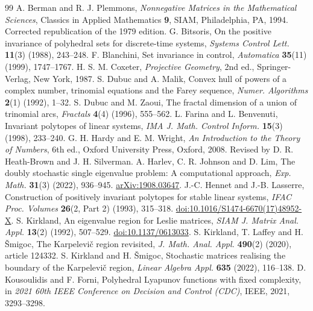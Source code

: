 \documentclass[11pt,a4paper]{article}
\theoremstyle{definition}
\theoremstyle{remark}
\numberwithin{equation}{section}
\begin{document}
\begin{thebibliography}{99}
 A. Berman and R. J. Plemmons,
\emph{Nonnegative Matrices in the Mathematical Sciences},
Classics in Applied Mathematics \textbf{9}, SIAM, Philadelphia, PA, 1994.
Corrected republication of the 1979 edition.
 G. Bitsoris,
On the positive invariance of polyhedral sets for discrete-time systems,
\emph{Systems Control Lett.} \textbf{11}(3) (1988), 243--248.
 F. Blanchini,
Set invariance in control,
\emph{Automatica} \textbf{35}(11) (1999), 1747--1767.
 H. S. M. Coxeter,
\emph{Projective Geometry}, 2nd ed., Springer-Verlag, New York, 1987.
 S. Dubuc and A. Malik,
Convex hull of powers of a complex number, trinomial equations and the Farey sequence,
\emph{Numer. Algorithms} \textbf{2}(1) (1992), 1--32.
 S. Dubuc and M. Zaoui,
The fractal dimension of a union of trinomial arcs,
\emph{Fractals} \textbf{4}(4) (1996), 555--562.
 L. Farina and L. Benvenuti,
Invariant polytopes of linear systems,
\emph{IMA J. Math. Control Inform.} \textbf{15}(3) (1998), 233--240.
 G. H. Hardy and E. M. Wright,
\emph{An Introduction to the Theory of Numbers}, 6th ed.,
Oxford University Press, Oxford, 2008.
Revised by D. R. Heath-Brown and J. H. Silverman.
 A. Harlev, C. R. Johnson and D. Lim,
The doubly stochastic single eigenvalue problem: A computational approach,
\emph{Exp. Math.} \textbf{31}(3) (2022), 936--945.
\href{https://arxiv.org/abs/1908.03647}{arXiv:1908.03647}.
 J.-C. Hennet and J.-B. Lasserre,
Construction of positively invariant polytopes for stable linear systems,
\emph{IFAC Proc. Volumes} \textbf{26}(2, Part 2) (1993), 315--318.
\href{https://doi.org/10.1016/S1474-6670(17)48952-X}{doi:10.1016/S1474-6670(17)48952-X}.
 S. Kirkland,
An eigenvalue region for Leslie matrices,
\emph{SIAM J. Matrix Anal. Appl.} \textbf{13}(2) (1992), 507--529.
\href{https://doi.org/10.1137/0613033}{doi:10.1137/0613033}.
 S. Kirkland, T. Laffey and H. \v{S}migoc,
The Karpelevi\v{c} region revisited,
\emph{J. Math. Anal. Appl.} \textbf{490}(2) (2020), article 124332.
 S. Kirkland and H. \v{S}migoc,
Stochastic matrices realising the boundary of the Karpelevi\v{c} region,
\emph{Linear Algebra Appl.} \textbf{635} (2022), 116--138.
 D. Kousoulidis and F. Forni,
Polyhedral Lyapunov functions with fixed complexity,
in \emph{2021 60th IEEE Conference on Decision and Control (CDC)},
IEEE, 2021, 3293--3298.

\end{thebibliography}
\end{document}
